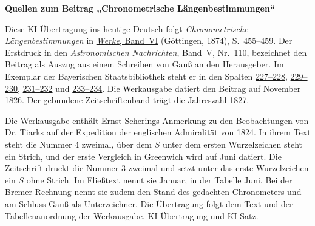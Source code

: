 \clearpage\thispagestyle{empty}
\begin{center}\textbf{Quellen zum Beitrag „Chronometrische Längenbestimmungen“}\end{center}
\noindent Diese KI-Übertragung ins heutige Deutsch folgt \textit{Chronometrische Längenbestimmungen} in \href{https://gdz.sub.uni-goettingen.de/id/PPN236007467}{\textit{Werke}, Band~VI} (Göttingen, 1874), S.~455--459. Der Erstdruck in den \textit{Astronomischen Nachrichten}, Band~V, Nr.~110, bezeichnet den Beitrag als Auszug aus einem Schreiben von Gauß an den Herausgeber. Im Exemplar der Bayerischen Staatsbibliothek steht er in den Spalten \href{https://api.digitale-sammlungen.de/iiif/image/v2/bsb10049430_00124/full/1500,/0/default.jpg}{227--228}, \href{https://api.digitale-sammlungen.de/iiif/image/v2/bsb10049430_00125/full/1500,/0/default.jpg}{229--230}, \href{https://api.digitale-sammlungen.de/iiif/image/v2/bsb10049430_00126/full/1500,/0/default.jpg}{231--232} und \href{https://api.digitale-sammlungen.de/iiif/image/v2/bsb10049430_00127/full/1500,/0/default.jpg}{233--234}. Die Werkausgabe datiert den Beitrag auf November 1826. Der gebundene Zeitschriftenband trägt die Jahreszahl 1827.
\par\smallskip\noindent Die Werkausgabe enthält Ernst Scherings Anmerkung zu den Beobachtungen von Dr. Tiarks auf der Expedition der englischen Admiralität von 1824. In ihrem Text steht die Nummer 4 zweimal, über dem $S$ unter dem ersten Wurzelzeichen steht ein Strich, und der erste Vergleich in Greenwich wird auf Juni datiert. Die Zeitschrift druckt die Nummer 3 zweimal und setzt unter das erste Wurzelzeichen ein $S$ ohne Strich. Im Fließtext nennt sie Januar, in der Tabelle Juni. Bei der Bremer Rechnung nennt sie zudem den Stand des gedachten Chronometers und am Schluss Gauß als Unterzeichner. Die Übertragung folgt dem Text und der Tabellenanordnung der Werkausgabe. KI-Übertragung und KI-Satz.
\clearpage
